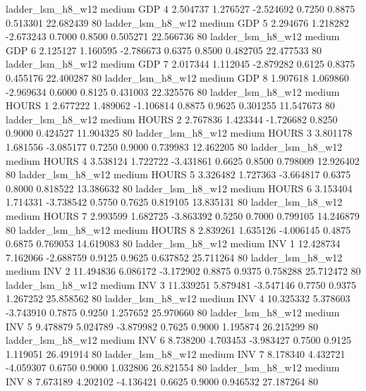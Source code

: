      ladder_lsm_h8_w12     medium      GDP                 4  2.504737 1.276527 -2.524692 0.7250 0.8875  0.513301   22.682439 80
     ladder_lsm_h8_w12     medium      GDP                 5  2.294676 1.218282 -2.673243 0.7000 0.8500  0.505271   22.566736 80
     ladder_lsm_h8_w12     medium      GDP                 6  2.125127 1.160595 -2.786673 0.6375 0.8500  0.482705   22.477533 80
     ladder_lsm_h8_w12     medium      GDP                 7  2.017344 1.112045 -2.879282 0.6125 0.8375  0.455176   22.400287 80
     ladder_lsm_h8_w12     medium      GDP                 8  1.907618 1.069860 -2.969634 0.6000 0.8125  0.431003   22.325576 80
     ladder_lsm_h8_w12     medium    HOURS                 1  2.677222 1.489062 -1.106814 0.8875 0.9625  0.301255   11.547673 80
     ladder_lsm_h8_w12     medium    HOURS                 2  2.767836 1.423344 -1.726682 0.8250 0.9000  0.424527   11.904325 80
     ladder_lsm_h8_w12     medium    HOURS                 3  3.801178 1.681556 -3.085177 0.7250 0.9000  0.739983   12.462205 80
     ladder_lsm_h8_w12     medium    HOURS                 4  3.538124 1.722722 -3.431861 0.6625 0.8500  0.798009   12.926402 80
     ladder_lsm_h8_w12     medium    HOURS                 5  3.326482 1.727363 -3.664817 0.6375 0.8000  0.818522   13.386632 80
     ladder_lsm_h8_w12     medium    HOURS                 6  3.153404 1.714331 -3.738542 0.5750 0.7625  0.819105   13.835131 80
     ladder_lsm_h8_w12     medium    HOURS                 7  2.993599 1.682725 -3.863392 0.5250 0.7000  0.799105   14.246879 80
     ladder_lsm_h8_w12     medium    HOURS                 8  2.839261 1.635126 -4.006145 0.4875 0.6875  0.769053   14.619083 80
     ladder_lsm_h8_w12     medium      INV                 1 12.428734 7.162066 -2.688759 0.9125 0.9625  0.637852   25.711264 80
     ladder_lsm_h8_w12     medium      INV                 2 11.494836 6.086172 -3.172902 0.8875 0.9375  0.758288   25.712472 80
     ladder_lsm_h8_w12     medium      INV                 3 11.339251 5.879481 -3.547146 0.7750 0.9375  1.267252   25.858562 80
     ladder_lsm_h8_w12     medium      INV                 4 10.325332 5.378603 -3.743910 0.7875 0.9250  1.257652   25.970660 80
     ladder_lsm_h8_w12     medium      INV                 5  9.478879 5.024789 -3.879982 0.7625 0.9000  1.195874   26.215299 80
     ladder_lsm_h8_w12     medium      INV                 6  8.738200 4.703453 -3.983427 0.7500 0.9125  1.119051   26.491914 80
     ladder_lsm_h8_w12     medium      INV                 7  8.178340 4.432721 -4.059307 0.6750 0.9000  1.032806   26.821554 80
     ladder_lsm_h8_w12     medium      INV                 8  7.673189 4.202102 -4.136421 0.6625 0.9000  0.946532   27.187264 80
